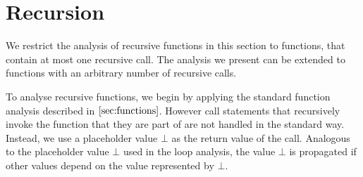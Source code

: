 \section{Recursion}
We restrict the analysis of recursive functions in this section to functions, that contain at most one recursive call. The analysis we present can be extended to functions with an arbitrary number of recursive calls.

To analyse recursive functions, we begin by applying the standard function analysis described in $\ref{sec:functions}$. However call statements that recursively invoke the function that they are part of are not handled in the standard way. Instead, we use a placeholder value $\bot$ as the return value of the call. Analogous to the placeholder value $\bot$ used in the loop analysis, the value $\bot$ is propagated if other values depend on the value represented by $\bot$.

\iffalse
\begin{figure}
\centering
    \begin{subfigure}{.5\textwidth}
        \centering
    \begin{algorithm}[H]
        \hspace*{\algorithmicindent} \textbf{Input} $\mIn: int$ \\
        \hspace*{\algorithmicindent} \textbf{Output} $\mOut: int$\\
        \begin{algorithmic}[1]
            \State $\mOut \leftarrow $ \textsc{sumRec}$(\mIn, 0)$
            \vspace{1em}
            \Procedure{sumRec}{$x: int, \: y: int$}: int
            \If{$x == 0$}
                \State $z_0: int \leftarrow y$ 
                \Else
                \State $z_1: int \leftarrow$ \textsc{sumRec}$(x - 1, y + 1)$
            \EndIf
            \State $z_2 \leftarrow \phi(z_0, z_1)$
            \State \Return $z_2$
            \EndProcedure
        \end{algorithmic} 
    \end{algorithm}
    \caption{Program containing a recursive function. The recursive function takes two arguments and adds their values together.}\label{fig:rec}
    \end{subfigure}
    \hfill
    \begin{subfigure}{.45\textwidth}
    \centering
        \begin{align*}
    dVec(x) := & [x^2 x^1 x^0] \\
    dVec(y) := & [y^2 y^1 x^0] \\
    dVec(z_0) := & [y^2 y^1 y^0] \\
    dVec(z_1) := & \bot \\
    dVec(z_2) := & \mathbb{IF}([x^2 x^1 x^0] == [000]), \\
    & \: [y^2 y^1 y^0], \: \bot)
\end{align*}
    \caption{Dependency vectors for the values in \textsc{sumRec}$(\cdot, \cdot)$}
    \end{subfigure}
    \caption{Example demonstrating the analysis of recursive functions}\label{fig:rec}
\end{figure}
\fi

